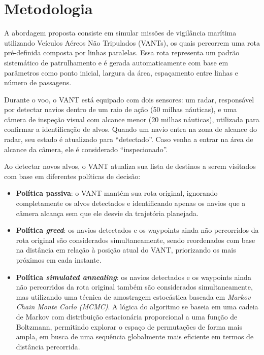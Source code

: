 \section{Metodologia}

A abordagem proposta consiste em simular missões de vigilância marítima utilizando Veículos Aéreos Não Tripulados (VANTs), os quais percorrem uma rota pré-definida composta por linhas paralelas. Essa rota representa um padrão sistemático de patrulhamento e é gerada automaticamente com base em parâmetros como ponto inicial, largura da área, espaçamento entre linhas e número de passagens.

Durante o voo, o VANT está equipado com dois sensores: um radar, responsável por detectar navios dentro de um raio de ação (50 milhas náuticas), e uma câmera de inspeção visual com alcance menor (20 milhas náuticas), utilizada para confirmar a identificação de alvos. Quando um navio entra na zona de alcance do radar, seu estado é atualizado para ``detectado''. Caso venha a entrar na área de alcance da câmera, ele é considerado ``inspecionado''.

Ao detectar novos alvos, o VANT atualiza sua lista de destinos a serem visitados com base em diferentes políticas de decisão:

\begin{itemize}
    \item \textbf{Política passiva}: o VANT mantém sua rota original, ignorando completamente os alvos detectados e identificando apenas os navios que a câmera alcança sem que ele desvie da trajetória planejada.

    \item \textbf{Política \textit{greed}}: os navios detectados e os waypoints ainda não percorridos da rota original são considerados simultaneamente, sendo reordenados com base na distância em relação à posição atual do VANT, priorizando os mais próximos em cada instante.
    \item \textbf{Política \textit{simulated annealing}}: os navios detectados e os waypoints ainda não percorridos da rota original também são considerados simultaneamente, mas utilizando uma técnica de amostragem estocástica baseada em \textit{Markov Chain Monte Carlo (MCMC)}. A lógica do algoritmo se baseia em uma cadeia de Markov com distribuição estacionária proporcional a uma função de Boltzmann, permitindo explorar o espaço de permutações de forma mais ampla, em busca de uma sequência globalmente mais eficiente em termos de distância percorrida.
\end{itemize}

